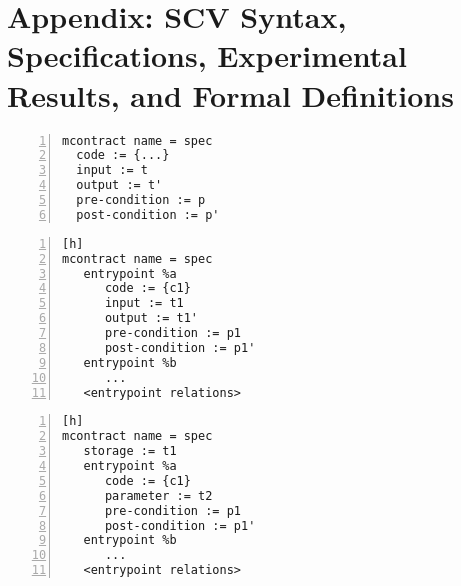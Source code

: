 \section{Appendix: SCV Syntax, Specifications, Experimental Results, and Formal Definitions}
\label{sec:appendix}
\begin{lstlisting}[float=tp,captionpos=b,caption={Smart contract property specification for a simple contract},label={lst:smart-contract-property-specification},numbers=left]
mcontract name = spec
  code := {...}
  input := t
  output := t'
  pre-condition := p
  post-condition := p'
\end{lstlisting}

\begin{lstlisting}[float,captionpos=b,caption={Multiple entrypoint specification syntax (option 1)},label={lst:multiple-entrypoint-specification-1},numbers=left][h]
mcontract name = spec
   entrypoint %a 
      code := {c1}
      input := t1
      output := t1'
      pre-condition := p1
      post-condition := p1'
   entrypoint %b 
      ...
   <entrypoint relations>
\end{lstlisting}

\begin{lstlisting}[float,captionpos=b,caption={Multiple entrypoint specification syntax (option 2)},label={lst:multiple-entrypoint-specification-2},numbers=left][h]
mcontract name = spec
   storage := t1
   entrypoint %a 
      code := {c1}
      parameter := t2
      pre-condition := p1
      post-condition := p1'
   entrypoint %b 
      ...
   <entrypoint relations>
\end{lstlisting}

